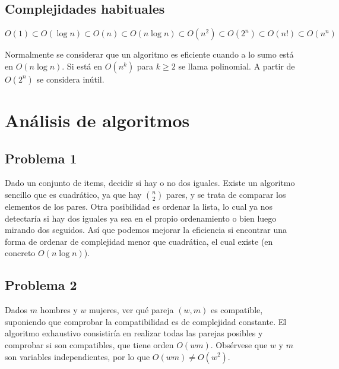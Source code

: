 \documentclass[AL.tex]{subfiles}
\begin{document}
\subsection{Complejidades habituales}

$O(1)\subset O(\log n)\subset O(n)\subset O(n\log n)\subset O(n^2)\subset O(2^n)\subset O(n!)\subset O(n^n)$

Normalmente se considerar que un algoritmo es eficiente cuando a lo sumo está en $O(n\log n)$. Si está en $O(n^k)$ para $k\geq 2$ se llama polinomial. A partir de $O(2^n)$ se considera inútil.


%
%
%
%
%
%

\section{Análisis de algoritmos}

\subsection{Problema 1}
Dado un conjunto de items, decidir si hay o no dos iguales. Existe un algoritmo sencillo que es cuadrático, ya que hay $\binom{n}{2}$ pares, y se trata de comparar los elementos de los pares. Otra posibilidad es ordenar la lista, lo cual ya nos detectaría si hay dos iguales ya sea en el propio ordenamiento o bien luego mirando dos seguidos. Así que podemos mejorar la eficiencia si encontrar una forma de ordenar de complejidad menor que cuadrática, el cual existe (en concreto $O(n\log n)$).

\subsection{Problema 2}
Dados $m$ hombres y $w$ mujeres, ver qué pareja $(w,m)$ es compatible, suponiendo que comprobar la compatibilidad es de complejidad constante. %
El algoritmo exhaustivo consistiría en realizar todas las parejas posibles y comprobar si son compatibles, que tiene orden $O(wm)$. Obsérvese que $w$ y $m$ son variables independientes, por lo que $O(wm)\neq O(w^2)$. 
\end{document}
